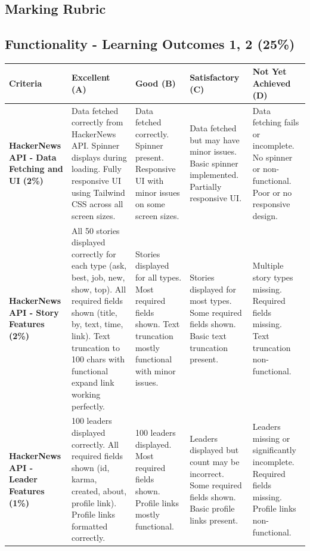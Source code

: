 \documentclass{article}
\begin{document}
	\begin{landscape}

	\section*{Marking Rubric}

	\subsection*{Functionality - Learning Outcomes 1, 2 (25\%)}

\renewcommand{\arraystretch}{1.3}
\begin{tabular}{|p{5cm}|p{4cm}|p{4cm}|p{4cm}|p{4cm}|}
\hline
\textbf{Criteria} & \textbf{Excellent (A)} & \textbf{Good (B)} & \textbf{Satisfactory (C)} & \textbf{Not Yet Achieved (D)} \\ \hline

\textbf{HackerNews API - Data Fetching and UI (2\%)} & 
Data fetched correctly from HackerNews API. Spinner displays during loading. Fully responsive UI using Tailwind CSS across all screen sizes. & 
Data fetched correctly. Spinner present. Responsive UI with minor issues on some screen sizes. & 
Data fetched but may have minor issues. Basic spinner implemented. Partially responsive UI. & 
Data fetching fails or incomplete. No spinner or non-functional. Poor or no responsive design. \\ \hline

\textbf{HackerNews API - Story Features (2\%)} & 
All 50 stories displayed correctly for each type (ask, best, job, new, show, top). All required fields shown (title, by, text, time, link). Text truncation to 100 chars with functional expand link working perfectly. & 
Stories displayed for all types. Most required fields shown. Text truncation mostly functional with minor issues. & 
Stories displayed for most types. Some required fields shown. Basic text truncation present. & 
Multiple story types missing. Required fields missing. Text truncation non-functional. \\ \hline

\textbf{HackerNews API - Leader Features (1\%)} & 
100 leaders displayed correctly. All required fields shown (id, karma, created, about, profile link). Profile links formatted correctly. & 
100 leaders displayed. Most required fields shown. Profile links mostly functional. & 
Leaders displayed but count may be incorrect. Some required fields shown. Basic profile links present. & 
Leaders missing or significantly incomplete. Required fields missing. Profile links non-functional. \\ \hline


\end{tabular}
\end{landscape}
\end{document}
